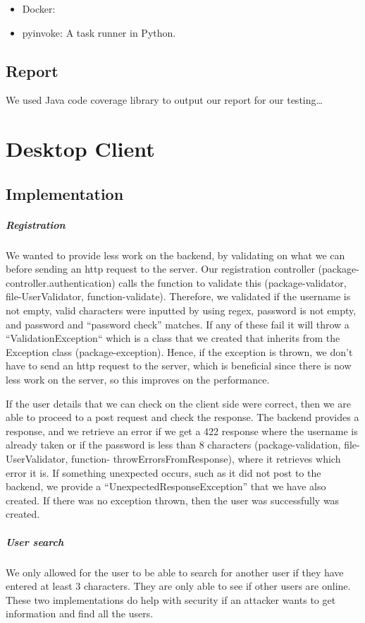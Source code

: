 \documentclass[11pt,a4paper]{report}
\begin{document}
\begin{itemize}
  \item Docker:
  \item pyinvoke: A task runner in Python.
\end{itemize}

\subsection{Report}
We used Java code coverage library to output our report for our testing…

\section{Desktop Client}

\subsection{Implementation}

\subparagraph{Registration}
We wanted to provide less work on the backend, by validating on what we can before sending an http request to the server. Our registration controller (package-controller.authentication) calls the function to validate this (package-validator, file-UserValidator, function-validate). Therefore, we validated if the username is not empty, valid characters were inputted by using regex, password is not empty, and password and “password check” matches. If any of these fail it will throw a “ValidationException“ which is a class that we created that inherits from the Exception class (package-exception). Hence, if the exception is thrown, we don’t have to send an http request to the server, which is beneficial since there is now less work on the server, so this improves on the performance.

If the user details that we can check on the client side were correct, then we are able to proceed to a post request and check the response. The backend provides a response, and we retrieve an error if we get a 422 response where the username is already taken or if the password is less than 8 characters (package-validation, file-UserValidator, function- throwErrorsFromResponse), where it retrieves which error it is. If something unexpected occurs, such as it did not post to the backend, we provide a “UnexpectedResponseException” that we have also created. If there was no exception thrown, then the user was successfully was created.

\subparagraph{User search}
We only allowed for the user to be able to search for another user if they have entered at least 3 characters. They are only able to see if other users are online. These two implementations do help with security if an attacker wants to get information and find all the users.
\end{document}
